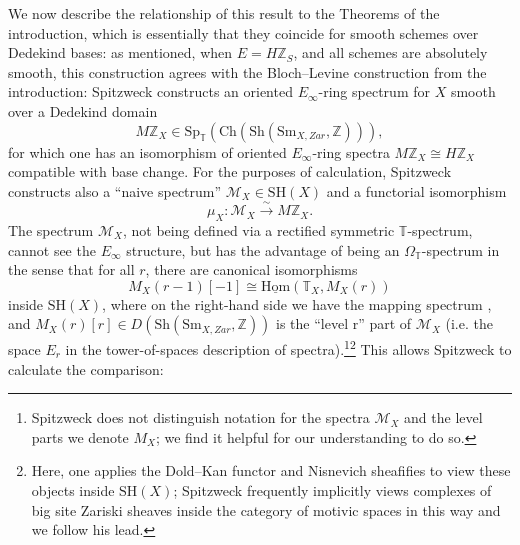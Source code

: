 \documentclass[a4paper,reqno,11pt]{amsart}
\theoremstyle{plain}
\theoremstyle{definition}
\theoremstyle{remark}
\newcommand{\Ch}{{\mathrm{Ch}}}
\newcommand{\Sh}{{\mathrm{Sh}}}
\newcommand{\Sm}{{\mathrm{Sm}}}
\newcommand{\Z}{\mathbb{Z}}
\newcommand{\T}{\mathbb{T}}
\newcommand{\SH}{\mathrm{SH}}
\newcommand{\Hom}{\mathrm{Hom}}
\begin{document}
We now describe the relationship of this result to the Theorems of the introduction, which is essentially that they coincide for smooth schemes over Dedekind bases: as mentioned, when $E=H\Z_S$, and all schemes are absolutely smooth, this construction agrees with the Bloch--Levine construction from the introduction: Spitzweck constructs \cite[\S4.4]{Sp} an oriented $E_\infty$-ring spectrum for $X$ smooth over a Dedekind domain
\[
M\Z_X \in \mathrm{Sp}_\T(\Ch(\Sh(\Sm_{X,Zar}, \Z))),
\]
for which one has an isomorphism of oriented $E_\infty$-ring spectra $M\Z_X \cong H\Z_X$ \cite{BH} compatible with base change. For the purposes of calculation, Spitzweck constructs also a ``naive spectrum'' $\mathcal{M}_X\in \SH(X)$ and a functorial isomorphism
\[
\mu_X:\mathcal{M}_X\xrightarrow{\sim} M\Z_X.
\]
The spectrum $\mathcal{M}_X$, not being defined via a rectified symmetric $\T$-spectrum, cannot see the $E_\infty$ structure, but has the advantage of being an $\Omega_\T$-spectrum in the sense that for all $r$, there are canonical isomorphisms
\[
M_X(r-1)[-1] \cong \underline{\Hom}(\T_X, M_X(r))
\]
inside $\SH(X)$, where on the right-hand side we have the mapping spectrum \cite[Proposition 5.29]{Sp}, and $M_X(r)[r]\in D(\Sh(\Sm_{X,Zar},\Z))$ is the ``level r'' part of $\mathcal{M}_X$ (i.e. the space $E_r$ in the tower-of-spaces description of spectra).\footnote{Spitzweck does not distinguish notation for the spectra $\mathcal{M}_X$ and the level parts we denote $M_X$; we find it helpful for our understanding to do so.}\footnote{Here, one applies the Dold--Kan functor and Nisnevich sheafifies to view these objects inside $\SH(X)$; Spitzweck frequently implicitly views complexes of big site Zariski sheaves inside the category of motivic spaces in this way and we follow his lead.} This allows Spitzweck to calculate the comparison:
\end{document}
